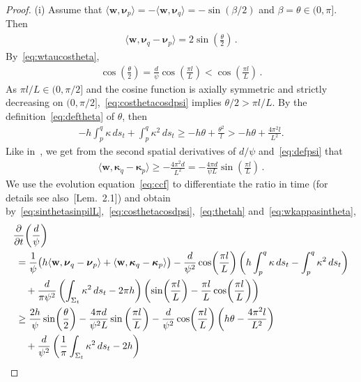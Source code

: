 \documentclass[reqno]{amsart}
\theoremstyle{definition}
\def\bkappa{\boldsymbol\kappa}
\def\bw{\mathbf{w}}
\def\intst{\int_{\St}}
\def\nnu{\boldsymbol{\nu}}
\def\pa{\partial}
\def\Si{\Sigma}
\def\St{\Si_t}
\newcommand{\fracp}[2]{{\frac{\pa #1}{\pa #2}}}
\begin{document}
\begin{proof}
(i) Assume that $\langle\bw,\nnu_p\rangle=-\langle\bw,\nnu_q\rangle=-\sin(\beta/2)$ and $\beta=\theta\in(0,\pi]$.
Then\begin{align}\label{eq:sinthetasinpilL}
\langle\bw,\nnu_q-\nnu_p\rangle
=2\sin\!\left(\frac\theta2\right)\,.
\end{align}
By~\eqref{eq:wtaucostheta},
\begin{align}\label{eq:costhetacosdpsi}
\cos\!\left(\frac\theta2\right)
=\frac d\psi\cos\!\left(\frac{\pi l}{L}\right)
<\cos\!\left(\frac{\pi l}{L}\right)\,.
\end{align}
As $\pi l/\!L\in(0,\pi/2]$ and the cosine function is axially symmetric and strictly decreasing on $(0,\pi/2]$,~\eqref{eq:costhetacosdpsi} implies $\theta/2>\pi l/L$. 
By the definition~\eqref{eq:deftheta} of $\theta$, then
\begin{align}\label{eq:thetah}
-h\int_p^q\kappa\,ds_t+\int_p^q\kappa^2\,ds_t
\geq-h\theta+\frac{\theta^2}l
>-h\theta+\frac{4\pi^2l}{L^2}.
\end{align}
Like in~\cite{Huisken95}, we get from the second spatial derivatives of $d/\psi$ and~\eqref{eq:defpsi} that
\begin{align}\label{eq:wkappasintheta}
\langle\bw,\bkappa_q-\bkappa_p\rangle
\geq-\frac{4\pi^2d}{L^2}
=-\frac{4\pi d}{\psi L}\sin\left(\frac{\pi l}{L}\right)\,.
\end{align} 
We use the evolution equation~\eqref{eq:ccf} to differentiate the ratio in time (for details see also~\cite{Dittberner21}[Lem.~2.1]) and obtain by~\eqref{eq:sinthetasinpilL},~\eqref{eq:costhetacosdpsi},~\eqref{eq:thetah} and~\eqref{eq:wkappasintheta},
\begin{align*}
&\fracp{}{t}\!\left(\frac d\psi\right) \notag\\
&\;=\frac1\psi\big(h\langle\bw,\nnu_q-\nnu_p\rangle+\langle\bw,\bkappa_q-\bkappa_p\rangle\big) 
		-\frac d{\psi^2}\cos\!\left(\frac{\pi l}{L}\right)
		\left(h\int_p^q\kappa\,ds_t-\int_p^q\kappa^2\,ds_t\right) \notag\\
	&\;\quad+\frac d{\pi\psi^2}\left(\intst\kappa^2\,ds_t-2\pi h\right)
			\left(\sin\!\left(\frac{\pi l}{L}\right)-\frac{\pi l}{L}\cos\!\left(\frac{\pi l}{L}\right)\right)\notag\\
&\;\geq\frac{2h}\psi\sin\!\left(\frac\theta2\right) 
		-\frac{4\pi d}{\psi^2 L}\sin\left(\frac{\pi l}{L}\right)
		-\frac d{\psi^2}\cos\!\left(\frac{\pi l}{L}\right)
		\left(h\theta-\frac{4\pi^2l}{L^2}\right)\notag\\
	&\;\quad+\frac{d}{\psi^2}\left(\frac1{\pi}\intst\kappa^2\,ds_t-2h\right)

\end{align*}
\end{proof}
\end{document}
